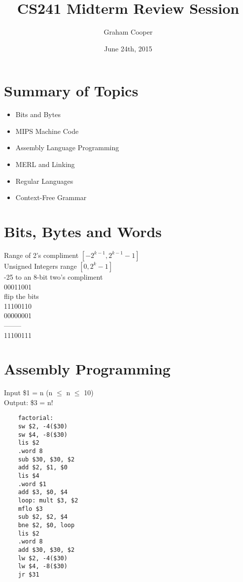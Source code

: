 \documentclass[12pt]{article}
\title{\vspace{-15ex}CS241 Midterm Review Session\vspace{-1ex}}
\date{June 24th, 2015}
\author{Graham Cooper}
\begin{document}
	\maketitle
	
	\section*{Summary of Topics}
	\begin{itemize}
		\item Bits and Bytes
		\item MIPS Machine Code
		\item Assembly Language Programming
		\item MERL and Linking
		\item Regular Languages
		\item Context-Free Grammar
	\end{itemize}
	
	\section*{Bits, Bytes and Words}
	
	Range of 2's compliment $[-2^{k-1}, 2^{k-1}-1]$\\
	Unsigned Integers range $[0, 2^k - 1]$\\
	
	-25 to an 8-bit two's compliment\\
	00011001\\
	flip the bits\\
	11100110\\
	00000001\\
	--------\\
	11100111\\
	
	\section*{Assembly Programming}
	Input \$1 = n (n $\leq$ n $\leq$ 10)\\
	Output: \$3 = n!\\
	\lstset{language=[mips]Assembler}
	\begin{lstlisting}
	factorial:
	sw $2, -4($30)
	sw $4, -8($30)
	lis $2
	.word 8
	sub $30, $30, $2
	add $2, $1, $0
	lis $4
	.word $1
	add $3, $0, $4
	loop: mult $3, $2
	mflo $3
	sub $2, $2, $4
	bne $2, $0, loop
	lis $2
	.word 8
	add $30, $30, $2
	lw $2, -4($30)
	lw $4, -8($30)
	jr $31
	\end{lstlisting}
	
\end{document}
